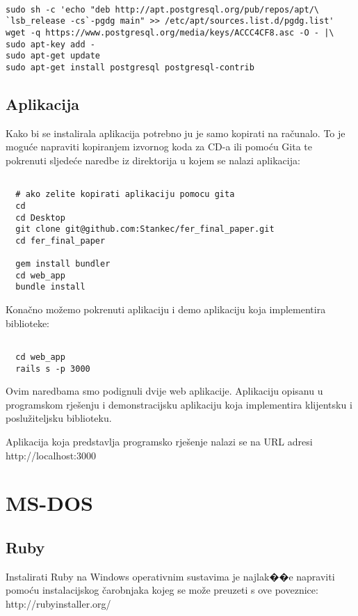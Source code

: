 \documentclass[times, utf8, zavrsni]{fer}
\begin{document}
\begin{lstlisting}

sudo sh -c 'echo "deb http://apt.postgresql.org/pub/repos/apt/\
`lsb_release -cs`-pgdg main" >> /etc/apt/sources.list.d/pgdg.list'
wget -q https://www.postgresql.org/media/keys/ACCC4CF8.asc -O - |\
sudo apt-key add -
sudo apt-get update
sudo apt-get install postgresql postgresql-contrib

\end{lstlisting}

\subsection{Aplikacija}
Kako bi se instalirala aplikacija potrebno ju je samo kopirati na računalo.
To je moguće napraviti kopiranjem izvornog koda za CD-a ili pomoću Gita te
pokrenuti sljedeće naredbe iz direktorija u kojem se nalazi aplikacija:

\begin{lstlisting}

  # ako zelite kopirati aplikaciju pomocu gita
  cd
  cd Desktop
  git clone git@github.com:Stankec/fer_final_paper.git
  cd fer_final_paper

  gem install bundler
  cd web_app
  bundle install

\end{lstlisting}

Konačno možemo pokrenuti aplikaciju i demo aplikaciju koja implementira
biblioteke:

\begin{lstlisting}

  cd web_app
  rails s -p 3000

\end{lstlisting}

Ovim naredbama smo podignuli dvije web aplikacije. Aplikaciju opisanu u
programskom rješenju i demonstracijsku aplikaciju koja implementira klijentsku
i poslužiteljsku biblioteku.

Aplikacija koja predstavlja programsko rješenje nalazi se na URL adresi
http://localhost:3000

\section{MS-DOS}
\subsection{Ruby}
Instalirati Ruby na Windows operativnim sustavima je najlak��e napraviti pomoću
instalacijskog čarobnjaka kojeg se može preuzeti s ove poveznice:
http://rubyinstaller.org/
\end{document}
